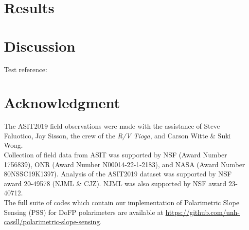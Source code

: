 \documentclass[letterpaper,journal]{IEEEtran}
\begin{document}
\section{Results}

\newpage

\section{Discussion}
\label{sec:discussion}

Test reference: \cite{}

\section*{Acknowledgment}

The ASIT2019 field observations were made with the assistance of Steve Faluotico, Jay Sisson, the crew of the \textit{R/V Tioga}, and Carson Witte \& Suki Wong.\\

Collection of field data from ASIT was supported by NSF (Award Number 1756839), ONR (Award Number N00014-22-1-2183), and NASA (Award Number 80NSSC19K1397). Analysis of the ASIT2019 dataset was supported by NSF award 20-49578 (NJML \& CJZ). NJML was also supported by NSF award 23-40712.\\

The full suite of codes which contain our implementation of Polarimetric Slope Sensing (PSS) for DoFP polarimeters are available at \url{https://github.com/unh-cassll/polarimetric-slope-sensing}.



\newpage




\newpage
\end{document}
